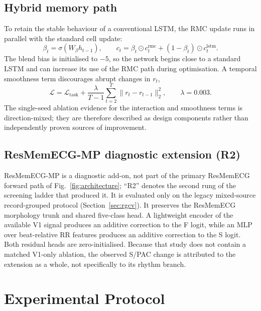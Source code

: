 \documentclass[pdflatex,sn-mathphys-num]{sn-jnl}
\begin{document}
\subsection{Hybrid memory path}
To retain the stable behaviour of a conventional LSTM, the RMC update runs in
parallel with the standard cell update:
\begin{equation}
\beta_t=\sigma(W_\beta h_{t-1}),\qquad
c_t=\beta_t\odot c_t^{\mathrm{rmc}}+(1-\beta_t)\odot c_t^{\mathrm{lstm}}.
\end{equation}
The blend bias is initialised to $-5$, so the network begins close to a standard
LSTM and can increase its use of the RMC path during optimisation. A temporal
smoothness term discourages abrupt changes in $r_t$,
\begin{equation}
\mathcal{L}=\mathcal{L}_{\mathrm{task}}+
\frac{\lambda}{T-1}\sum_{t=2}^{T}\lVert r_t-r_{t-1}\rVert_2^2,
\qquad \lambda=0.003.
\end{equation}
The single-seed ablation evidence for the interaction and smoothness terms is
direction-mixed; they are therefore described as design components rather than
independently proven sources of improvement.

\subsection{ResMemECG-MP diagnostic extension (R2)}
ResMemECG-MP is a diagnostic add-on, not part of the primary ResMemECG forward
path of Fig.~\ref{fig:architecture}; ``R2'' denotes the second rung of the
screening ladder that produced it. It is evaluated only on the legacy
mixed-source record-grouped protocol
(Section~\ref{sec:rgcv}). It preserves the ResMemECG morphology trunk and shared
five-class head. A lightweight encoder of the available V1 signal produces an
additive correction to the F logit, while an MLP over beat-relative RR features
produces an additive correction to the S logit. Both residual heads are
zero-initialised. Because that study does not contain a matched V1-only
ablation, the observed S/PAC change is attributed to the extension as a whole,
not specifically to its rhythm branch.

\section{Experimental Protocol}
\end{document}
